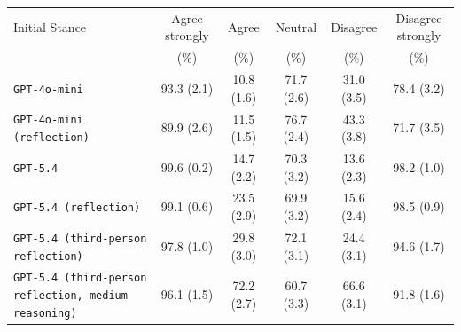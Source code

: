\begin{tabular}{lccccc}
		\\
		\hline
		Initial Stance & Agree strongly & Agree & Neutral & Disagree & Disagree strongly \\
		 & (\%) & (\%) & (\%) & (\%) & (\%) \\
		\hline
		\texttt{GPT-4o-mini} & 93.3 (2.1) & 10.8 (1.6) & 71.7 (2.6) & 31.0 (3.5) & 78.4 (3.2) \\
		\texttt{GPT-4o-mini (reflection)} & 89.9 (2.6) & 11.5 (1.5) & 76.7 (2.4) & 43.3 (3.8) & 71.7 (3.5) \\
		\texttt{GPT-5.4} & 99.6 (0.2) & 14.7 (2.2) & 70.3 (3.2) & 13.6 (2.3) & 98.2 (1.0) \\
		\texttt{GPT-5.4 (reflection)} & 99.1 (0.6) & 23.5 (2.9) & 69.9 (3.2) & 15.6 (2.4) & 98.5 (0.9) \\
		\texttt{GPT-5.4 (third-person reflection)} & 97.8 (1.0) & 29.8 (3.0) & 72.1 (3.1) & 24.4 (3.1) & 94.6 (1.7) \\
		\texttt{GPT-5.4 (third-person reflection, medium reasoning)} & 96.1 (1.5) & 72.2 (2.7) & 60.7 (3.3) & 66.6 (3.1) & 91.8 (1.6) \\
		\hline
\end{tabular}
